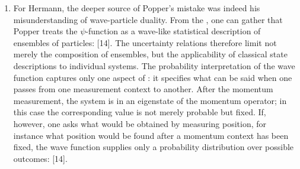 \documentclass[pdflatex]{sn-jnl}
\newcommand{\LdF}{\bt{Logik der Forschung}\xspace}
\newcommand{\UR}{uncertainty relations\xspace}
\begin{document}
\begin{enumerate}
\item For Hermann, the deeper source of Popper's mistake was indeed his misunderstanding of wave-particle duality. From the \LdF, one can gather that Popper treats the $\psi$-function as a wave-like statistical description of ensembles of particles:  [14]. The \UR therefore limit not merely the composition of ensembles, but the applicability of classical state descriptions to individual systems. The probability interpretation of the wave function captures only one aspect of \qm: it specifies what can be said when one passes from one measurement context to another. After the momentum measurement, the system is in an eigenstate of the momentum operator; in this case the corresponding value is not merely probable but fixed. If, however, one asks what would be obtained by measuring position, for instance what position would be found after a momentum context has been fixed, the wave function supplies only a probability distribution over possible outcomes:  [14].



\end{enumerate}
\end{document}
